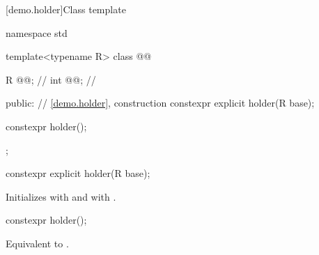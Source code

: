 [demo.holder]{Class template }

\begin{codeblock}
namespace std {
  template<typename R>
  class @@ {
    R @@;    // \expos
    int @@; // \expos

  public:
    // \ref{demo.holder}, construction
    constexpr explicit holder(R base);

    constexpr holder();
  };
}
\end{codeblock}

%
\begin{itemdecl}
constexpr explicit holder(R base);
\end{itemdecl}

\begin{itemdescr}
\pnum
\effects
Initializes  with  and  with .
\end{itemdescr}

%
\begin{itemdecl}
constexpr holder();
\end{itemdecl}

\begin{itemdescr}
\pnum
\effects
Equivalent to .
\end{itemdescr}
